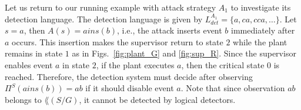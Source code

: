 \begin{example}
Let us return to our running example with attack strategy $A_1$ to investigate its detection language.
The detection language is given by $L_{det}^{A_1} = \{a, ca, cca, \dots\}$.
Let $s = a$, then $A(s) = a ins(b)$, i.e., the attack inserts event $b$ immediately after $a$ occurs. 
This insertion makes the supervisor return to state $2$ while the plant remains in state $1$ as in Figs.~\ref{fig:plant_G} and \ref{fig:sup_R}.
Since the supervisor enables event $a$ in state $2$, if the plant executes $a$, then the critical state $0$ is reached.
Therefore, the detection system must decide after observing $\Pi^S(a ins(b)) = ab$ if it should disable event $a$.
Note that since observation $ab$ belongs to $\lang(S/G)$, it cannot be detected by logical detectors.
\end{example}



